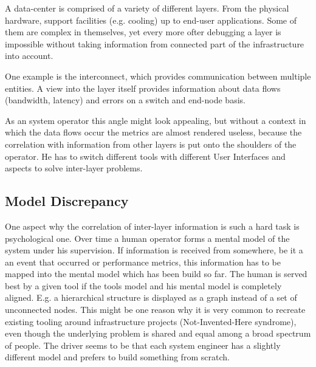 A data-center is comprised of a variety of different layers. From the physical hardware, support facilities (e.g. cooling) up to end-user applications.
Some of them are complex in themselves, yet every more ofter debugging a layer is impossible without taking information from connected part of the infrastructure into account.

One example is the interconnect, which provides communication between multiple entities.
A view into the layer itself provides information about data flows (bandwidth, latency) and errors on a switch and end-node basis.

As an system operator this angle might look appealing, but without a context in which the data flows occur the metrics are almost rendered useless, because
the correlation with information from other layers is put onto the shoulders of the operator.
He has to switch different tools with different User Interfaces and aspects to solve inter-layer problems.
\subsection{Model Discrepancy}
One aspect why the correlation of inter-layer information is such a hard task is psychological one. Over time a human operator forms a mental model
of the system under his supervision. If information is received from somewhere, be it a an event that occurred or performance metrics, this information
has to be mapped into the mental model which has been build so far.
The human is served best by a given tool if the tools model and his mental model is completely aligned.
E.g. a hierarchical structure is displayed as a graph instead of a set of unconnected nodes.
This might be one reason why it is very common to recreate existing tooling around infrastructure projects (Not-Invented-Here syndrome), even though the underlying problem
is shared and equal among a broad spectrum of people. The driver seems to be that each system engineer has a slightly different model and prefers to build something from scratch.


